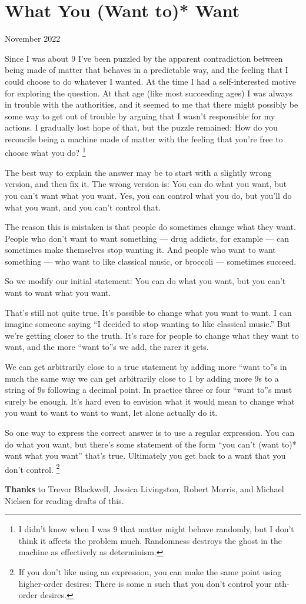 \chapter{What You (Want to)* Want}

November 2022

Since I was about 9 I've been puzzled by the apparent contradiction
between being made of matter that behaves in a predictable way, and the
feeling that I could choose to do whatever I wanted. At the time I had a
self-interested motive for exploring the question. At that age (like
most succeeding ages) I was always in trouble with the authorities, and
it seemed to me that there might possibly be some way to get out of
trouble by arguing that I wasn't responsible for my actions. I gradually
lost hope of that, but the puzzle remained: How do you reconcile being a
machine made of matter with the feeling that you're free to choose what
you do? \footnote{I didn't know when I was 9 that matter might behave randomly,
but I don't think it affects the problem much. Randomness destroys the
ghost in the machine as effectively as determinism.}

The best way to explain the answer may be to start with a slightly wrong
version, and then fix it. The wrong version is: You can do what you
want, but you can't want what you want. Yes, you can control what you
do, but you'll do what you want, and you can't control that.

The reason this is mistaken is that people do sometimes change what they
want. People who don't want to want something --- drug addicts, for
example --- can sometimes make themselves stop wanting it. And people
who want to want something --- who want to like classical music, or
broccoli --- sometimes succeed.

So we modify our initial statement: You can do what you want, but you
can't want to want what you want.

That's still not quite true. It's possible to change what you want to
want. I can imagine someone saying ``I decided to stop wanting to like
classical music.'' But we're getting closer to the truth. It's rare for
people to change what they want to want, and the more ``want to''s we
add, the rarer it gets.

We can get arbitrarily close to a true statement by adding more ``want
to''s in much the same way we can get arbitrarily close to 1 by adding
more 9s to a string of 9s following a decimal point. In practice three
or four ``want to''s must surely be enough. It's hard even to envision
what it would mean to change what you want to want to want to want, let
alone actually do it.

So one way to express the correct answer is to use a regular expression.
You can do what you want, but there's some statement of the form ``you
can't (want to)* want what you want'' that's true. Ultimately you get
back to a want that you don't control. \footnote{If you don't like using an expression, you can make the same
point using higher-order desires: There is some n such that you don't
control your nth-order desires.}


\textbf{Thanks} to Trevor Blackwell, Jessica Livingston, Robert Morris,
and Michael Nielsen for reading drafts of this.
